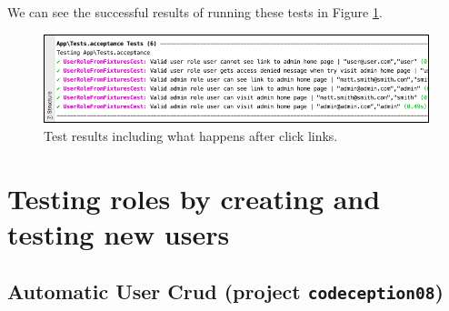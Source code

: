\documentclass[a4paperpaper,openright]{book}
\newenvironment{Shaded}{}{}
\newcommand{\CommentTok}[1]{\textcolor[rgb]{0.38,0.63,0.69}{\textit{#1}}}
\newcommand{\KeywordTok}[1]{\textcolor[rgb]{0.00,0.44,0.13}{\textbf{#1}}}
\newcommand{\NormalTok}[1]{#1}
\newcommand{\OtherTok}[1]{\textcolor[rgb]{0.00,0.44,0.13}{#1}}
\newcommand{\StringTok}[1]{\textcolor[rgb]{0.25,0.44,0.63}{#1}}
\begin{document}
\begin{Shaded}
\end{Shaded}

We can see the successful results of running these tests in Figure
\ref{postLinkTests}.

\begin{figure}
\centering
\includegraphics{./tex2pdf.-8aed53dcd332a606/87bd300b7a127998c328c97dfd1f26da408589f7.png}
\caption{Test results including what happens after click
links.\label{postLinkTests}}
\end{figure}

\hypertarget{testing-roles-by-creating-and-testing-new-users}{%
\chapter{Testing roles by creating and testing new
users}\label{testing-roles-by-creating-and-testing-new-users}}

\hypertarget{automatic-user-crud-project-codeception08}{%
\section{\texorpdfstring{Automatic User Crud (project
\texttt{codeception08})}{Automatic User Crud (project codeception08)}}\label{automatic-user-crud-project-codeception08}}
\end{document}
